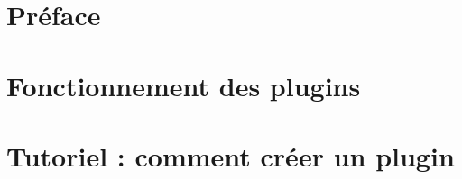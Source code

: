 \documentclass[a4paper]{report}
\begin{document}



\tableofcontents

\chapter{Préface}



\chapter{Fonctionnement des plugins}



\chapter{Tutoriel : comment créer un plugin}

\end{document}
